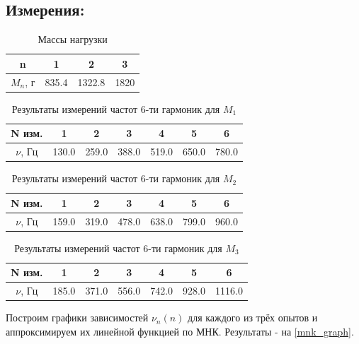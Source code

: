 \documentclass[
a4paper, %
12pt, %
]{article}
\begin{document}
	\subsection{Измерения:}
	
	\begin{table}[h]
		\centering
		\begin{tabular}{|c|c|c|c|}
			\hline
			n & 1 & 2 & 3  \\
			\hline
			$M_n$, г & 835.4 & 1322.8 & 1820 \\
			\hline
		\end{tabular}
		\caption{Массы нагрузки}
	\end{table}
	
	
	\begin{table}[h]
		\centering
		\begin{tabular}{|c|c|c|c|c|c|c|}
			\hline
			N изм. & 1 & 2 & 3 & 4 & 5 & 6 \\
			\hline
			$\nu$, Гц & 130.0 & 259.0 & 388.0 & 519.0 & 650.0 & 780.0 \\
			\hline
		\end{tabular}
		\caption{Результаты измерений частот 6-ти гармоник для $M_1$}
	\end{table}
	
	\begin{table}[h!]
		\centering
		\begin{tabular}{|c|c|c|c|c|c|c|}
			\hline
			N изм. & 1 & 2 & 3 & 4 & 5 & 6 \\
			\hline
			$\nu$, Гц & 159.0 & 319.0 & 478.0 & 638.0 & 799.0 & 960.0 \\
			\hline
		\end{tabular}
		\caption{Результаты измерений частот 6-ти гармоник для $M_2$}
	\end{table}
	
	\begin{table}[h!]
		\centering
		\begin{tabular}{|c|c|c|c|c|c|c|}
			\hline
			N изм. & 1 & 2 & 3 & 4 & 5 & 6 \\
			\hline
			$\nu$, Гц & 185.0 & 371.0 & 556.0 & 742.0 & 928.0 & 1116.0 \\
			\hline
		\end{tabular}
		\caption{Результаты измерений частот 6-ти гармоник для $M_3$}
	\end{table}
	
	
	Построим графики зависимостей $\nu_n(n)$ для каждого из трёх опытов и аппроксимируем их линейной функцией по МНК. Результаты - на \ref{mnk_graph}.
	
\end{document}

